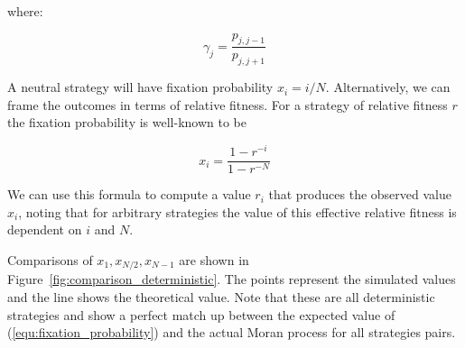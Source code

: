 \documentclass{article}
\begin{document}
where:

\[
\gamma_j = \frac{p_{j, j-1}}{p_{j, j+1}}
\]

A neutral strategy will have fixation probability $x_i = i/N$. Alternatively,
we can frame the outcomes in terms of relative fitness. For a strategy
of relative fitness $r$ the fixation probability is well-known to be

\[ x_i = \frac{1 - r^{-i}}{1 - r^{-N}} \]

We can use this formula to compute a value $r_i$ that produces the observed
value $x_i$, noting that for arbitrary strategies the value of this
effective relative fitness is dependent on $i$ and $N$.

Comparisons of \(x_1, x_{N/2}, x_{N-1}\) are shown in
Figure~\ref{fig:comparison_deterministic}. The points represent the simulated
values and the line shows the theoretical value. Note that these are all
deterministic strategies and show a perfect match up between the expected value
of (\ref{equ:fixation_probability}) and the actual Moran process for all
strategies pairs.
\end{document}
